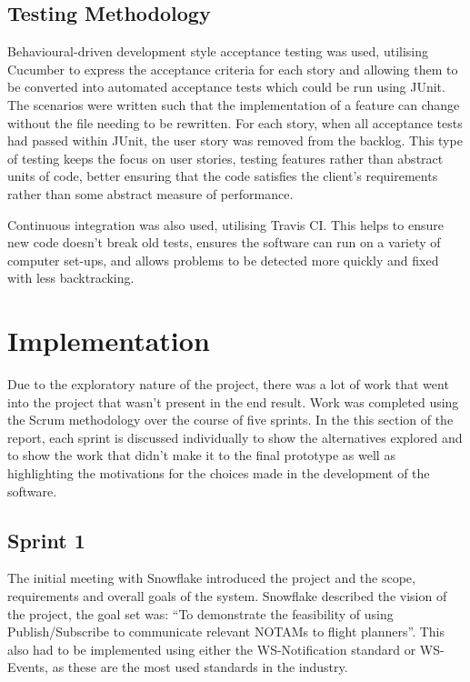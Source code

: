 \documentclass[a4paper, 12pt, twoside]{article}
\begin{document}
\subsection{Testing Methodology}
\label{sec:plan_testing_methodology}

Behavioural-driven development style acceptance testing was used, utilising Cucumber to express the acceptance criteria for each story and allowing them to be converted into automated acceptance tests which could be run using JUnit. The scenarios were written such that the implementation of a feature can change without the file needing to be rewritten. For each story, when all acceptance tests had passed within JUnit, the user story was removed from the backlog. This type of testing keeps the focus on user stories, testing features rather than abstract units of code, better ensuring that the code satisfies the client's requirements rather than some abstract measure of performance.

Continuous integration was also used, utilising Travis CI. This helps to ensure new code doesn't break old tests, ensures the software can run on a variety of computer set-ups, and allows problems to be detected more quickly and fixed with less backtracking.


\newpage

\section{Implementation}
\label{sec:implementation}

Due to the exploratory nature of the project, there was a lot of work that went into the project that wasn't present in the end result. Work was completed using the Scrum methodology over the course of five sprints. In the this section of the report, each sprint is discussed individually to show the alternatives explored and to show the work that didn't make it to the final prototype as well as highlighting the motivations for the choices made in the development of the software.

\subsection{Sprint 1}
\label{sec:impl_sprint_1}

The initial meeting with Snowflake introduced the project and the scope, requirements and overall goals of the system. Snowflake described the vision of the project, the goal set was: ``To demonstrate the feasibility of using Publish/Subscribe to communicate relevant NOTAMs to flight planners''. This also had to be implemented using either the WS-Notification standard or WS-Events, as these are the most used standards in the industry.
\end{document}

